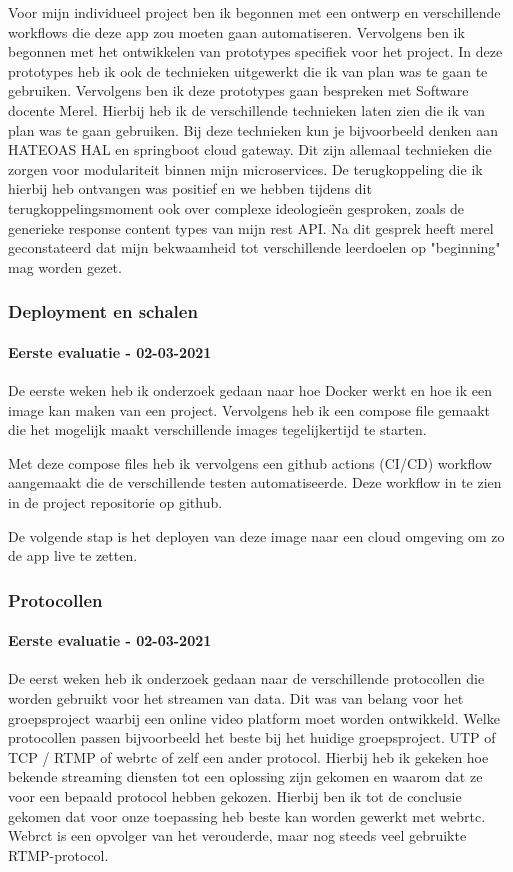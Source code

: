 Voor mijn individueel project ben ik begonnen met een ontwerp en verschillende workflows die deze app zou moeten gaan automatiseren.
Vervolgens ben ik begonnen met het ontwikkelen van prototypes specifiek voor het project. In deze prototypes heb ik ook de technieken uitgewerkt die ik van plan was te gaan te gebruiken.
Vervolgens ben ik deze prototypes gaan bespreken met Software docente Merel.
Hierbij heb ik de verschillende technieken laten zien die ik van plan was te gaan gebruiken. Bij deze technieken kun je bijvoorbeeld denken aan HATEOAS HAL en springboot cloud gateway.
Dit zijn allemaal technieken die zorgen voor modulariteit binnen mijn microservices.
De terugkoppeling die ik hierbij heb ontvangen was positief en we hebben tijdens dit terugkoppelingsmoment ook over complexe ideologieën gesproken, zoals de generieke response content types van mijn rest API.
Na dit gesprek heeft merel geconstateerd dat mijn bekwaamheid tot verschillende leerdoelen op "beginning" mag worden gezet.


\subsubsection{Deployment en schalen}
\paragraph{Eerste evaluatie - 02-03-2021}
De eerste weken heb ik onderzoek gedaan naar hoe Docker werkt en hoe ik een image kan maken van een project.
Vervolgens heb ik een compose file gemaakt die het mogelijk maakt verschillende images tegelijkertijd te starten.

Met deze compose files heb ik vervolgens een github actions (CI/CD) workflow aangemaakt die de verschillende testen automatiseerde.
Deze workflow in te zien in de project repositorie op github.

De volgende stap is het deployen van deze image naar een cloud omgeving om zo de app live te zetten.

\subsubsection{Protocollen}\label{subsec:protocollen}
\paragraph{Eerste evaluatie - 02-03-2021}
De eerst weken heb ik onderzoek gedaan naar de verschillende protocollen die worden gebruikt voor het streamen van data.
Dit was van belang voor het groepsproject waarbij een online video platform moet worden ontwikkeld.
Welke protocollen passen bijvoorbeeld het beste bij het huidige groepsproject.
UTP of TCP / RTMP of webrtc of zelf een ander protocol.
Hierbij heb ik gekeken hoe bekende streaming diensten tot een oplossing zijn gekomen en waarom dat ze voor een
bepaald protocol hebben gekozen.
Hierbij ben ik tot de conclusie gekomen dat voor onze toepassing heb beste kan worden gewerkt met webrtc.
Webrct is een opvolger van het verouderde, maar nog steeds veel gebruikte RTMP-protocol.


